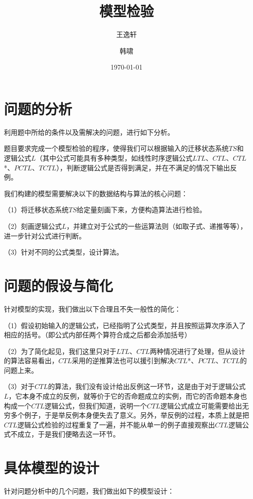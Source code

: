 \documentclass[UTF8]{ctexart}
\title{模型检验}
\author{王逸轩 \and 韩啸}
\date{\today}
\begin{document}
\maketitle






\section{问题的分析}
利用题中所给的条件以及需解决的问题，进行如下分析。

题目要求完成一个模型检验的程序，使得我们可以根据输入的迁移状态系统$TS$和逻辑公式$L$（其中公式可能具有多种类型，如线性时序逻辑公式$LTL$、$CTL$、$CTL$*、$PCTL$、$TCTL$），判断逻辑公式是否得到满足，并在不满足的情况下输出反例。

我们构建的模型需要解决以下的数据结构与算法的核心问题：

（1）将迁移状态系统$TS$给定量刻画下来，方便构造算法进行检验。

（2）刻画逻辑公式$L$，并建立对于公式的一些运算法则（如取子式、递推等等），进一步针对公式进行判断。

（3）针对不同的公式类型，设计算法。

\section{问题的假设与简化}
针对模型的实现，我们做出以下合理且不失一般性的简化：

（1）假设初始输入的逻辑公式，已经指明了公式类型，并且按照运算次序添入了相应的括号。（即公式内部任两个算符合成之后都会添加括号）

（2）为了简化起见，我们这里只对于$LTL$、$CTL$两种情况进行了处理，但从设计的算法容易看出，$CTL$采用的逆推算法也可以援引到解决$CTL$*、$PCTL$、$TCTL$的问题上来。

（3）对于$CTL$的算法，我们没有设计给出反例这一环节，这是由于对于逻辑公式$L$，它本身不成立的反例，就等价于它的否命题成立的实例，而它的否命题本身也构成一个$CTL$逻辑公式，但我们知道，说明一个$CTL$逻辑公式成立可能需要给出无穷多个例子，于是举反例本身便失去了意义。另外，举反例的过程，本质上就是把$CTL$逻辑公式检验的过程重复了一遍，并不能从单一的例子直接观察出$CTL$逻辑公式不成立，于是我们便略去这一环节。

\section{具体模型的设计}
针对问题分析中的几个问题，我们做出如下的模型设计：
\end{document}
